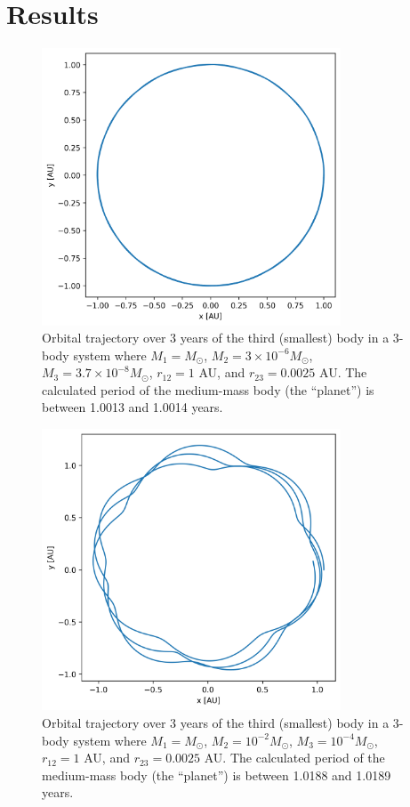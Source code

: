 \documentclass{article}
\begin{document}
\newpage

\section{Results}

\bigskip
{}
\medskip

\begin{figure}[H]
    \centering
    \includegraphics[width=3.5in]{homework4/1-1.png}
    \caption{Orbital trajectory over 3 years of the third (smallest) body in a 3-body system where $M_1=M_\odot$, $M_2=3\times10^{-6}M_\odot$, $M_3 = 3.7\times10^{-8}M_\odot$, $r_{12}=1$ AU, and $r_{23}= 0.0025$ AU. The calculated period of the medium-mass body (the ``planet'') is between 1.0013 and 1.0014 years.}
    \label{fig:1-1}
\end{figure}

\begin{figure}[H]
    \centering
    \includegraphics[width=3.5in]{homework4/1-2.png}
    \caption{Orbital trajectory over 3 years of the third (smallest) body in a 3-body system where $M_1=M_\odot$, $M_2=10^{-2}M_\odot$, $M_3 = 10^{-4}M_\odot$, $r_{12}=1$ AU, and $r_{23}= 0.0025$ AU. The calculated period of the medium-mass body (the ``planet'') is between 1.0188 and 1.0189 years.}
    \label{fig:1-2}
\end{figure}
\end{document}
